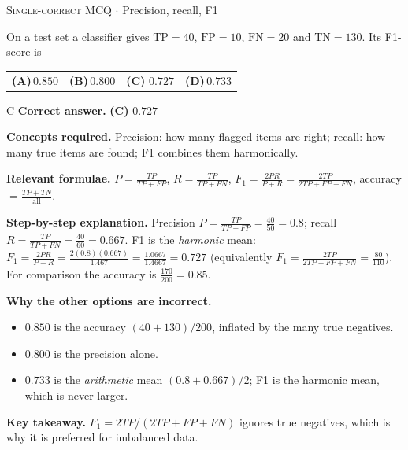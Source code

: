 \documentclass[11pt,a4paper]{article}
\newcommand{\optlabel}[1]{\textbf{(#1)}}
\newcommand{\correctlabel}[1]{\textcolor{okgreen}{\textbf{(#1)}\,\ding{51}}}
\newenvironment{qitem}[1]{\begin{list}{}{\setlength{\leftmargin}{3.3em}\setlength{\labelwidth}{3.1em}%
  \setlength{\labelsep}{0.2em}\setlength{\topsep}{3pt}\setlength{\parsep}{3pt}}\item[\textbf{Q.#1}\hfill]}{\end{list}}
\newcommand{\qsep}{\par\vspace{2pt}{\color{black!15}\hrule}\vspace{4pt}}
\newcommand{\qmeta}[2]{{\footnotesize\color{black!60}\textsc{#1} \;$\cdot$\; #2}\par}
\begin{document}
\begin{qitem}{3}
\qmeta{Single-correct MCQ}{Precision, recall, F1}
On a test set a classifier gives $\text{TP} = 40$, $\text{FP} = 10$, $\text{FN} = 20$ and $\text{TN} = 130$. Its F1-score is
\par\smallskip\noindent\begin{tabularx}{\linewidth}{@{}*{4}{L}@{}}
\optlabel{A}\,$0.850$ & \optlabel{B}\,$0.800$ & \correctlabel{C}\,$0.727$ & \optlabel{D}\,$0.733$
\end{tabularx}
\end{qitem}
\begin{solbox}{C}
\textbf{\color{brand}Correct answer.} \textcolor{okgreen}{\textbf{(C)}} $0.727$

\textbf{\color{brand}Concepts required.} Precision: how many flagged items are right; recall: how many true items are found; F1 combines them harmonically.

\textbf{\color{brand}Relevant formulae.} $P = \frac{TP}{TP + FP}$, $R = \frac{TP}{TP + FN}$, $F_1 = \frac{2PR}{P + R} = \frac{2TP}{2TP + FP + FN}$, accuracy $= \frac{TP + TN}{\text{all}}$.

\textbf{\color{brand}Step-by-step explanation.} Precision $P = \frac{TP}{TP + FP} = \frac{40}{50} = 0.8$; recall $R = \frac{TP}{TP + FN} = \frac{40}{60} = 0.667$.
F1 is the \emph{harmonic} mean: $F_1 = \frac{2PR}{P + R} = \frac{2(0.8)(0.667)}{1.467} = \frac{1.0667}{1.4667} = 0.727$
(equivalently $F_1 = \frac{2TP}{2TP + FP + FN} = \frac{80}{110}$). For comparison the accuracy is $\frac{170}{200} = 0.85$.

\textbf{\color{brand}Why the other options are incorrect.}
\begin{itemize}[leftmargin=2.4em, itemsep=1pt, topsep=2pt]
\item[\textbf{(A)}] $0.850$ is the accuracy $(40 + 130)/200$, inflated by the many true negatives.
\item[\textbf{(B)}] $0.800$ is the precision alone.
\item[\textbf{(D)}] $0.733$ is the \emph{arithmetic} mean $(0.8 + 0.667)/2$; F1 is the harmonic mean, which is never larger.
\end{itemize}
\textbf{\color{brand}Key takeaway.} $F_1 = 2TP/(2TP + FP + FN)$ ignores true negatives, which is why it is preferred for imbalanced data.
\end{solbox}
\qsep
\end{document}
